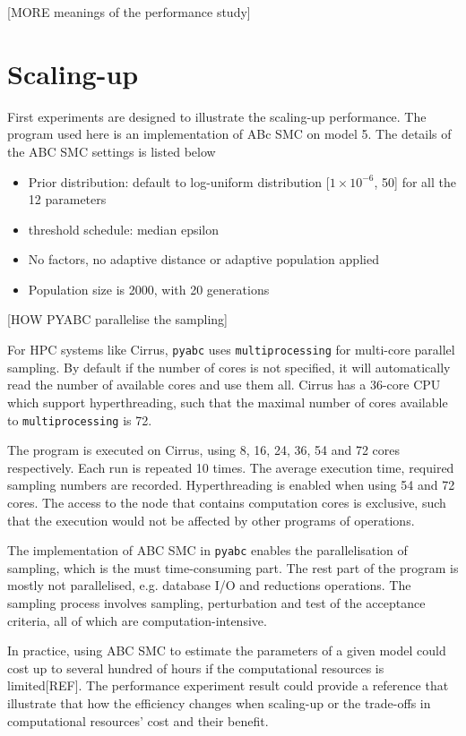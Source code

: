 \documentclass[12pt,a4paper]{report}
\begin{document}
[MORE meanings of the performance study]

\section{Scaling-up}

First experiments are designed to illustrate the scaling-up performance. The program used here is an implementation of ABc SMC on model 5. The details of the ABC SMC settings is listed below

\begin{itemize}
    \item Prior distribution: default to log-uniform distribution [$1\times 10^{-6}$, 50] for all the 12 parameters
    \item threshold schedule: median epsilon
    \item No factors, no adaptive distance or adaptive population applied
    \item Population size is 2000, with 20 generations
\end{itemize}

[HOW PYABC parallelise the sampling]

For HPC systems like Cirrus, \verb|pyabc| uses \verb|multiprocessing| for multi-core parallel sampling. By default if the number of cores is not specified, it will automatically read the number of available cores and use them all. Cirrus has a 36-core CPU which support hyperthreading, such that the maximal number of cores available to \verb|multiprocessing| is 72.

The program is executed on Cirrus, using 8, 16, 24, 36, 54 and 72 cores respectively. Each run is repeated 10 times. The average execution time, required sampling numbers are recorded. Hyperthreading is enabled when using 54 and 72 cores. The access to the node that contains computation cores is exclusive, such that the execution would not be affected by other programs of operations.

The implementation of ABC SMC in \verb|pyabc| enables the parallelisation of sampling, which is the must time-consuming part. The rest part of the program is mostly not parallelised, e.g. database I/O and reductions operations. The sampling process involves sampling, perturbation and test of the acceptance criteria, all of which are computation-intensive. 

In practice, using ABC SMC to estimate the parameters of a given model could cost up to several hundred of hours if the computational resources is limited[REF]. The performance experiment result could provide a reference that illustrate that how the efficiency changes when scaling-up or the trade-offs in computational resources' cost and their benefit.
\end{document}
